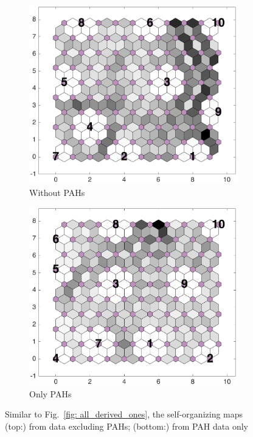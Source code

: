 \begin{figure}
    \begin{subfigure}[b]{0.5\textwidth}
        \centering
        \includegraphics[width=\textwidth]{../../images0.01/M31/2D/diff_dimension/combine_2D_data_between_cols11and26.png}
    \caption{Without PAHs}
    \label{fig: wt_pahs}
    \end{subfigure}
    \hfill
    \begin{subfigure}[b]{0.5\textwidth}
        \includegraphics[width=\textwidth]{../../images0.01/M31/2D/diff_dimension/combine_2D_data_between_cols3and10.png}
    \caption{Only PAHs}
    \label{fig: only_pahs}
    \end{subfigure}
    \caption{Similar to Fig.~\ref{fig: all_derived_ones}, the self-organizing maps (top:) from data excluding PAHs; (bottom:) from PAH data only}
    \label{fig: PAHS_or_not_PAHs}
\end{figure}
